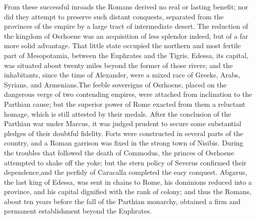 




From these successful inroads the Romans derived no real or
lasting benefit; nor did they attempt to preserve such distant
conquests, separated from the provinces of the empire by a large
tract of intermediate desert. The reduction of the kingdom of
Osrhoene was an acquisition of less splendor indeed, but of a far
more solid advantage. That little state occupied the northern and
most fertile part of Mesopotamia, between the Euphrates and the
Tigris. Edessa, its capital, was situated about twenty miles
beyond the former of those rivers; and the inhabitants, since the
time of Alexander, were a mixed race of Greeks, Arabs, Syrians,
and Armenians.\footnotemark[44] The feeble sovereigns of Osrhoene, placed on
the dangerous verge of two contending empires, were attached from
inclination to the Parthian cause; but the superior power of Rome
exacted from them a reluctant homage, which is still attested by
their medals. After the conclusion of the Parthian war under
Marcus, it was judged prudent to secure some substantial pledges
of their doubtful fidelity. Forts were constructed in several
parts of the country, and a Roman garrison was fixed in the
strong town of Nisibis. During the troubles that followed the
death of Commodus, the princes of Osrhoene attempted to shake off
the yoke; but the stern policy of Severus confirmed their
dependence,\footnotemark[45] and the perfidy of Caracalla completed the easy
conquest. Abgarus, the last king of Edessa, was sent in chains to
Rome, his dominions reduced into a province, and his capital
dignified with the rank of colony; and thus the Romans, about ten
years before the fall of the Parthian monarchy, obtained a firm
and permanent establishment beyond the Euphrates.\footnotemark[46]

